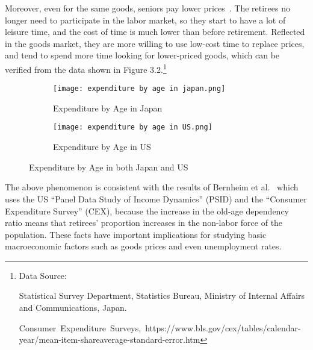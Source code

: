 \documentclass[ %
    final,
    scrbook,
    listoffigures,
    listoftables, 
    glossary]{cu-thesis}
\begin{document}
Moreover, even for the same goods, seniors pay lower prices~\cite{aguiar2007life}. The retirees no longer need to participate in the labor market, so they start to have a lot of leisure time, and the cost of time is much lower than before retirement. Reflected in the goods market, they are more willing to use low-cost time to replace prices, and tend to spend more time looking for lower-priced goods, which can be verified from the data shown in Figure 3.2.\footnote{Data Source:

\raggedright Statistical Survey Department, Statistics Bureau, Ministry of Internal Affairs and Communications, Japan.

\raggedright Consumer~Expenditure~Surveys,~https://www.bls.gov/cex/tables/calendar-year/mean-item-shareaverage-standard-error.htm}
\begin{figure}
     \centering
     \begin{subfigure}{0.4\textwidth}
         \centering
         \texttt{[image: expenditure by age in japan.png]}
         \caption{Expenditure by Age in Japan}
         \label{fig:exjp}
     \end{subfigure}
     \hfill
     \begin{subfigure}{0.4\textwidth}
         \centering
         \texttt{[image: expenditure by age in US.png]}
         \caption{Expenditure by Age in US}
         \label{fig:exus}
     \end{subfigure}
     \caption{Expenditure by Age in both Japan and US}
     \label{fig:expenditure}
\end{figure}
The above phenomenon is consistent with the results of Bernheim et al.~\cite{bernheim2001accounts} which uses the US “Panel Data Study of Income Dynamics” (PSID) and the “Consumer Expenditure Survey” (CEX), because the increase in the old-age dependency ratio means that retirees’ proportion increases in the non-labor force of the population. These facts have important implications for studying basic macroeconomic factors such as goods prices and even unemployment rates.
\end{document}
